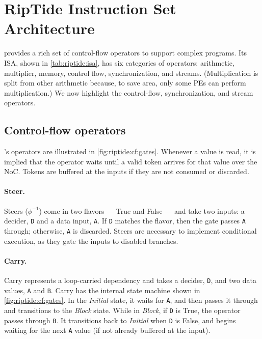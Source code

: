 \section{RipTide Instruction Set Architecture}
\label{sec:cf}



\riptide provides a rich set of control-flow operators to support complex programs.
% 
Its ISA, shown in \autoref{tab:riptide:isa}, has six categories of operators: arithmetic, multiplier, memory, control flow, synchronization, and streams.
%
(Multiplication is split from other arithmetic because, to save area, only some PEs can perform multiplication.)
%
We now highlight the control-flow, synchronization, and stream operators.

\subsection{Control-flow operators}
%
\riptide's operators are illustrated in \autoref{fig:riptide:cf:gates}.
%
Whenever a value is read, it is implied that the
operator waits until a valid token arrives for that value over the
NoC. Tokens are buffered at the inputs if they are not
consumed or discarded.

\figRipTideISA
\figRipTideCFGates

\figRipTideCompiler

\paragraph{Steer.} 
Steers ($\phi^{-1}$) come in two flavors --- True and False --- and take two inputs: a decider, {\tt D} and a data input, {\tt A}.
% 
If {\tt D} matches the flavor, then the gate passes {\tt A} through; otherwise, {\tt A} is discarded.
% 
Steers are necessary to implement conditional execution, as they gate the inputs to disabled branches.

\paragraph{Carry.}
\label{cf:carry}
% 
Carry represents a loop-carried dependency and takes a decider, {\tt D}, and two data values, {\tt A} and {\tt B}.
% 
Carry has the internal state machine shown in \autoref{fig:riptide:cf:gates}.
%
In the {\em Initial} state, it waits for {\tt A}, and then passes it through and transitions to the {\em Block} state.
%
While in {\em Block}, if {\tt D} is True, the operator passes through {\tt B}.
%
It transitions back to {\em Initial} when {\tt D} is False, and begins waiting for the next {\tt A} value (if not already buffered at the input).

